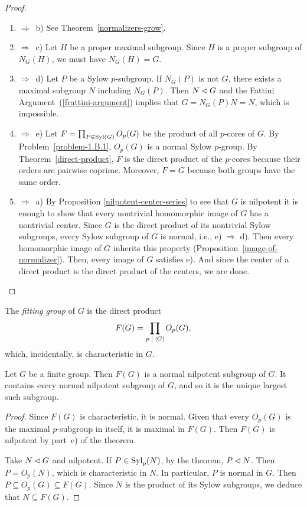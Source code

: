 \begin{proof}${}$

\begin{enumerate}[\rm a)]
    \item $\Rightarrow$~b) See Theorem~\ref{normalizers-grow}.
    \item $\Rightarrow$~c) Let $H$ be a proper maximal subgroup. Since $H$ is a proper subgroup of $N_G(H)$, we must have $N_G(H)=G$.
    \item $\Rightarrow$~d) Let $P$ be a Sylow $p$-subgroup. If $N_G(P)$ is not $G$, there exists a maximal subgroup $N$ including $N_G(P)$. Then $N\lhd G$ and the Fattini Argument~(\ref{frattini-argument}) implies that $G=N_G(P)N=N$, which is impossible.
    \item $\Rightarrow$~e) Let $F=\prod_{P\in{\rm Syl}(G)}O_p(G)$ be the product of all $p$-cores of $G$. By Problem~\ref{problem-1.B.1}, $O_p(G)$ is a normal Sylow $p$-group. By Theorem~\ref{direct-product}, $F$ is the direct product of the $p$-cores because their orders are pairwise coprime. Moreover, $F=G$ because both groups have the same order.
    \item $\Rightarrow$~a) By Proposition \ref{nilpotent-center-series} to see that $G$ is nilpotent it is enough to show that every nontrivial homomorphic image of $G$ has a nontrivial center. Since $G$ is the direct product of its nontrivial Sylow subgroups, every Sylow subgroup of $G$ is normal, i.e., e) $\Rightarrow$ d). Then every homomorphic image of $G$ inherits this property (Proposition~\ref{image-of-normalizer}). Then, every image of $G$ satisfies e). And since the center of a direct product is the direct product of the centers, we are done.
\end{enumerate}
\end{proof}

\begin{defn}
    The \textsl{fitting group} of\/ $G$ is the direct product
    $$
        F(G)=\prod_{p\;\mid\;\left\vert{G}\right\vert}O_p(G),
    $$
    which, incidentally, is characteristic in\/ $G$.
\end{defn}

\begin{cor}\label{normal-nilpotent-fitting}
    Let\/ $G$ be a finite group. Then\/ $F(G)$ is a normal nilpotent subgroup of\/ $G$. It contains every normal nilpotent subgroup of\/ $G$, and so it is the unique largest such subgroup.
\end{cor}

\begin{proof} Since $F(G)$ is characteristic, it is normal. Given that every $O_p(G)$ is the maximal $p$-subgroup in itself, it is maximal in $F(G)$. Then $F(G)$ is nilpotent by part~e) of the theorem.

Take $N\lhd G$ and nilpotent. If $P\in{\rm Syl}_p(N)$, by the theorem, $P\lhd N$. Then $P=O_p(N)$, which is characteristic in $N$. In particular, $P$ is normal in $G$. Then $P\subseteq O_p(G)\subseteq F(G)$. Since $N$ is the product of its Sylow subgroups, we deduce that $N\subseteq F(G)$.  \end{proof}

